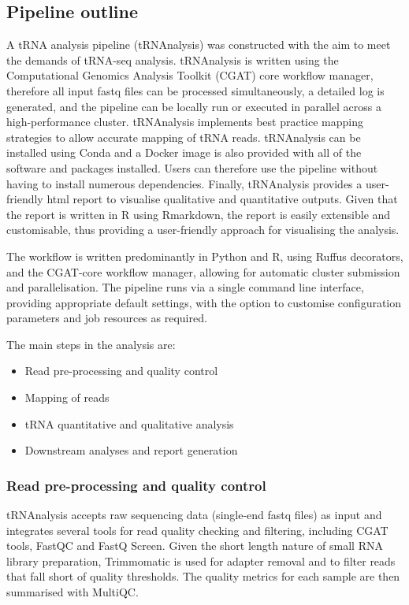 \subsection{Pipeline outline}
A tRNA analysis pipeline (tRNAnalysis) was constructed with the aim to meet the demands of tRNA-seq analysis.
tRNAnalysis is written using the Computational Genomics Analysis Toolkit (CGAT) core workflow manager\cite{cribbs2019cgat}, therefore all input fastq files can be processed simultaneously, a detailed log is generated, and the pipeline can be locally run or executed in parallel across a high-performance cluster.
tRNAnalysis implements best practice mapping strategies to allow accurate mapping of tRNA reads\cite{hoffmann2018accurate}.
tRNAnalysis can be installed using Conda and a Docker image is also provided with all of the software and packages installed.
Users can therefore use the pipeline without having to install numerous dependencies.
Finally, tRNAnalysis provides a user-friendly html report to visualise qualitative and quantitative outputs.
Given that the report is written in R using Rmarkdown, the report is easily extensible and customisable, thus providing a user-friendly approach for visualising the analysis.

The workflow is written predominantly in Python and R, using Ruffus decorators\cite{goodstadt2010ruffus}, and the CGAT-core workflow manager\cite{cribbs2019cgat}, allowing for automatic cluster submission and parallelisation.
The pipeline runs via a single command line interface, providing appropriate default settings, with the option to customise configuration parameters and job resources as required.

\noindent
The main steps in the analysis are:
\begin{itemize}
  \item Read pre-processing and quality control
  \item Mapping of reads
  \item tRNA quantitative and qualitative analysis
  \item Downstream analyses and report generation
\end{itemize}

\subsubsection{Read pre-processing and quality control}
tRNAnalysis accepts raw sequencing data (single-end fastq files) as input and integrates several tools for read quality checking and filtering, including CGAT tools\cite{sims2014cgat}, FastQC\cite{andrewfastqc} and FastQ Screen\cite{wingett2018fastq}.
Given the short length nature of small RNA library preparation, Trimmomatic\cite{bolger2014trimmomatic} is used for adapter removal and to filter reads that fall short of quality thresholds.
The quality metrics for each sample are then summarised with MultiQC\cite{ewels2016multiqc}.

